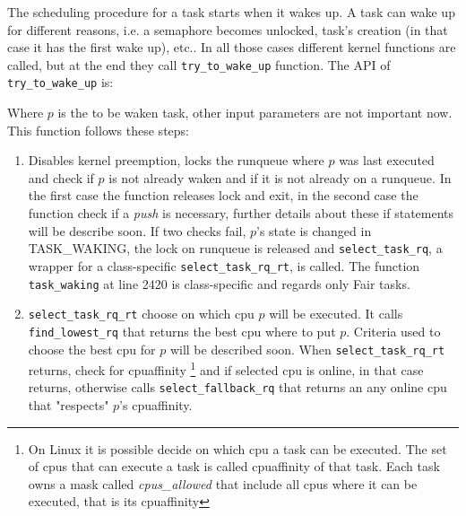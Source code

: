 The scheduling procedure for a task starts when it wakes up. A task can wake up
for different reasons, i.e. a semaphore becomes unlocked, task's creation
(in that case it has the first wake up), etc.. In all those cases different
kernel functions are called, but at the end they call 
\texttt{try\_to\_wake\_up} function. The API of \texttt{try\_to\_wake\_up} is:

\lstset{basicstyle=\footnotesize, language=c, captionpos=b, frame=single, label=lis:APIttwu}


Where $p$ is the to be waken task, other input parameters are not important now.
This function follows these steps:

\begin{enumerate}
\item Disables kernel preemption, locks the runqueue where $p$ was last executed and check 
if $p$ is not already waken and if it is not already on a runqueue. In the first case the 
function releases lock and exit, in the second case the function check if a
\textit{push} is necessary, further details about these if statements will be
describe soon. If two checks fail, $p$'s state is changed in TASK\_WAKING, the
lock on runqueue is released and \texttt{select\_task\_rq}, a wrapper for a 
class-specific \texttt{select\_task\_rq\_rt}, is called. The function 
\texttt{task\_waking} at line 2420 is class-specific and regards only Fair tasks.

\lstset{basicstyle=\footnotesize, language=c, captionpos=b, frame=single,label=lis:steps}


\item \texttt{select\_task\_rq\_rt} choose on which cpu $p$ will be executed. It
calls \texttt{find\_lowest\_rq} that returns the best cpu where to put $p$. Criteria
used to choose the best cpu for $p$ will be described soon. When \texttt{select\_task\_rq\_rt} 
returns, check for cpuaffinity \footnote{On Linux it is possible decide on which
cpu a task can be executed. The set of cpus that can execute a task is called 
cpuaffinity of that task. Each task owns a mask called \textit{cpus\_allowed} 
that include all cpus where it can be executed, that is its cpuaffinity} and 
if selected cpu is online, in that case returns, otherwise calls 
\texttt{select\_fallback\_rq} that returns an any online cpu that "respects" 
$p$'s cpuaffinity.

\lstset{basicstyle=\footnotesize, language=c, captionpos=b, frame=single,label=lis:steps}



\end{enumerate}
